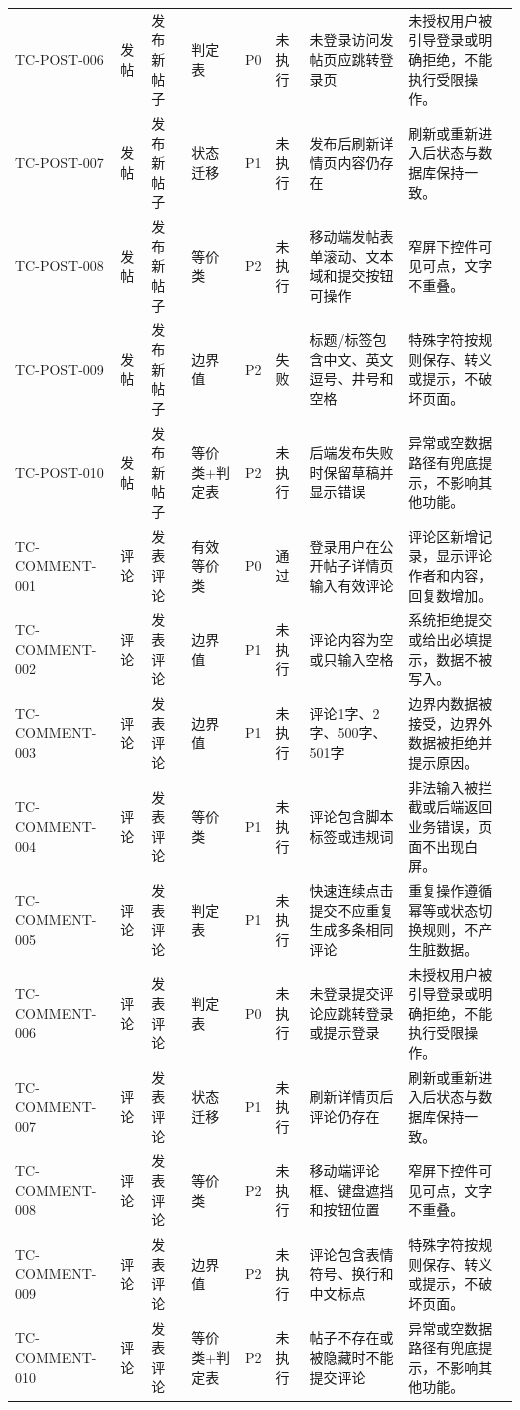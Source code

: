 \documentclass[UTF8,zihao=-4]{ctexart}
\begin{document}
{\begin{longtable}{P{1.8cm}P{1.7cm}P{2.2cm}P{1.8cm}P{1cm}P{1.2cm}P{4.1cm}P{5.3cm}}
TC-POST-006 & 发帖 & 发布新帖子 & 判定表 & P0 & 未执行 & 未登录访问发帖页应跳转登录页 & 未授权用户被引导登录或明确拒绝，不能执行受限操作。 \\
TC-POST-007 & 发帖 & 发布新帖子 & 状态迁移 & P1 & 未执行 & 发布后刷新详情页内容仍存在 & 刷新或重新进入后状态与数据库保持一致。 \\
TC-POST-008 & 发帖 & 发布新帖子 & 等价类 & P2 & 未执行 & 移动端发帖表单滚动、文本域和提交按钮可操作 & 窄屏下控件可见可点，文字不重叠。 \\
TC-POST-009 & 发帖 & 发布新帖子 & 边界值 & P2 & 失败 & 标题/标签包含中文、英文逗号、井号和空格 & 特殊字符按规则保存、转义或提示，不破坏页面。 \\
TC-POST-010 & 发帖 & 发布新帖子 & 等价类+判定表 & P2 & 未执行 & 后端发布失败时保留草稿并显示错误 & 异常或空数据路径有兜底提示，不影响其他功能。 \\
TC-COMMENT-001 & 评论 & 发表评论 & 有效等价类 & P0 & 通过 & 登录用户在公开帖子详情页输入有效评论 & 评论区新增记录，显示评论作者和内容，回复数增加。 \\
TC-COMMENT-002 & 评论 & 发表评论 & 边界值 & P1 & 未执行 & 评论内容为空或只输入空格 & 系统拒绝提交或给出必填提示，数据不被写入。 \\
TC-COMMENT-003 & 评论 & 发表评论 & 边界值 & P1 & 未执行 & 评论1字、2字、500字、501字 & 边界内数据被接受，边界外数据被拒绝并提示原因。 \\
TC-COMMENT-004 & 评论 & 发表评论 & 等价类 & P1 & 未执行 & 评论包含脚本标签或违规词 & 非法输入被拦截或后端返回业务错误，页面不出现白屏。 \\
TC-COMMENT-005 & 评论 & 发表评论 & 判定表 & P1 & 未执行 & 快速连续点击提交不应重复生成多条相同评论 & 重复操作遵循幂等或状态切换规则，不产生脏数据。 \\
TC-COMMENT-006 & 评论 & 发表评论 & 判定表 & P0 & 未执行 & 未登录提交评论应跳转登录或提示登录 & 未授权用户被引导登录或明确拒绝，不能执行受限操作。 \\
TC-COMMENT-007 & 评论 & 发表评论 & 状态迁移 & P1 & 未执行 & 刷新详情页后评论仍存在 & 刷新或重新进入后状态与数据库保持一致。 \\
TC-COMMENT-008 & 评论 & 发表评论 & 等价类 & P2 & 未执行 & 移动端评论框、键盘遮挡和按钮位置 & 窄屏下控件可见可点，文字不重叠。 \\
TC-COMMENT-009 & 评论 & 发表评论 & 边界值 & P2 & 未执行 & 评论包含表情符号、换行和中文标点 & 特殊字符按规则保存、转义或提示，不破坏页面。 \\
TC-COMMENT-010 & 评论 & 发表评论 & 等价类+判定表 & P2 & 未执行 & 帖子不存在或被隐藏时不能提交评论 & 异常或空数据路径有兜底提示，不影响其他功能。 \\

\end{longtable}}
\end{document}
